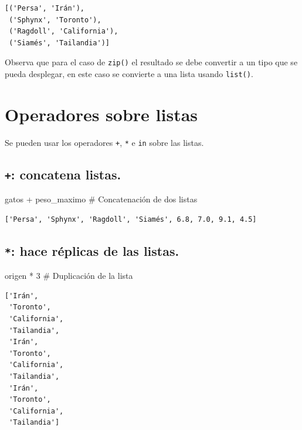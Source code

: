 \documentclass[
  spanish,
  letterpaper,
]{scrbook}
\newenvironment{Shaded}{\begin{snugshade}}{\end{snugshade}}
\newcommand{\CommentTok}[1]{\textcolor[rgb]{0.37,0.37,0.37}{#1}}
\newcommand{\DecValTok}[1]{\textcolor[rgb]{0.68,0.00,0.00}{#1}}
\newcommand{\NormalTok}[1]{\textcolor[rgb]{0.00,0.23,0.31}{#1}}
\newcommand{\OperatorTok}[1]{\textcolor[rgb]{0.37,0.37,0.37}{#1}}
\theoremstyle{definition}
\theoremstyle{remark}
\begin{document}
\begin{verbatim}
[('Persa', 'Irán'),
 ('Sphynx', 'Toronto'),
 ('Ragdoll', 'California'),
 ('Siamés', 'Tailandia')]
\end{verbatim}

Observa que para el caso de \texttt{zip()} el resultado se debe
convertir a un tipo que se pueda desplegar, en este caso se convierte a
una lista usando \texttt{list()}.

\section{Operadores sobre listas}\label{operadores-sobre-listas}

Se pueden usar los operadores \texttt{+}, \texttt{*} e \texttt{in} sobre
las listas.

\subsection{\texorpdfstring{\texttt{+}: concatena
listas.}{+: concatena listas.}}\label{concatena-listas.}

\begin{Shaded}
\begin{Highlighting}[]
\NormalTok{gatos }\OperatorTok{+}\NormalTok{ peso\_maximo }\CommentTok{\# Concatenación de dos listas}
\end{Highlighting}
\end{Shaded}

\begin{verbatim}
['Persa', 'Sphynx', 'Ragdoll', 'Siamés', 6.8, 7.0, 9.1, 4.5]
\end{verbatim}

\subsection{\texorpdfstring{\texttt{*}: hace réplicas de las
listas.}{*: hace réplicas de las listas.}}\label{hace-ruxe9plicas-de-las-listas.}

\begin{Shaded}
\begin{Highlighting}[]
\NormalTok{origen }\OperatorTok{*} \DecValTok{3} \CommentTok{\# Duplicación de la lista}
\end{Highlighting}
\end{Shaded}

\begin{verbatim}
['Irán',
 'Toronto',
 'California',
 'Tailandia',
 'Irán',
 'Toronto',
 'California',
 'Tailandia',
 'Irán',
 'Toronto',
 'California',
 'Tailandia']
\end{verbatim}
\end{document}
